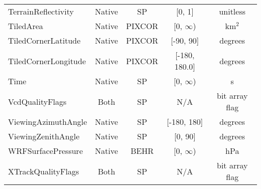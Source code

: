 \documentclass[12pt]{article}
\begin{document}
\begin{center}
\begin{longtable}{lcccc}
	TerrainReflectivity	&	Native 		&	SP			&	[0, 1]		& unitless \\
	TiledArea			&	Native		& 	PIXCOR		&	[0, $\infty$) & km$^{2}$ \\
	TiledCornerLatitude	&	Native		&	PIXCOR		&	[-90, 90] & degrees \\
	TiledCornerLongitude &	Native		&	PIXCOR		&	[-180, 180.0] & degrees \\
	Time					&	Native	 	&	SP			&	[0, $\infty$)	& s \\
	VcdQualityFlags		&	Both 		&	SP			&	N/A				& bit array flag \\
	ViewingAzimuthAngle	&	Native	 	&	SP			&	[-180, 180]	& degrees \\
	ViewingZenithAngle	&	Native	 	&	SP			&	[0, 90]		& degrees \\
	WRFSurfacePressure	&	Native		& 	BEHR			&	[0, $\infty$)	& hPa \\
	XTrackQualityFlags	&	Both 		&	SP			&	N/A				& bit array flag \\
	
	\end{longtable}

	\end{center}
\end{document}
